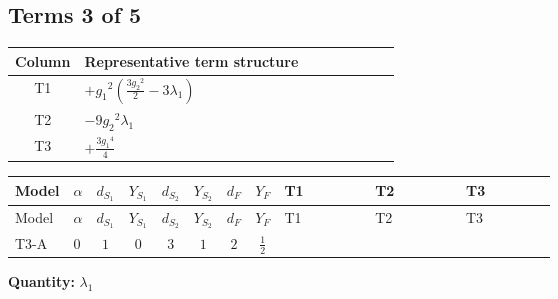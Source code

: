 \documentclass[8pt]{article}
\begin{document}
\begin{landscape}
\subsection*{Terms 3 of 5}
\begin{center}
\begin{tabular}{@{}c >{\raggedright\arraybackslash}p{0.82\linewidth}@{}}
\toprule
Column & Representative term structure \\
\midrule
T1 & \(\displaystyle +{g_1}^2 \left(\frac{3 {g_2}^2}{2}-3 {\lambda_1}\right)\) \\
\midrule
T2 & \(\displaystyle -9 {g_2}^2 {\lambda_1}\) \\
\midrule
T3 & \(\displaystyle +\frac{3 {g_1}^4}{4}\) \\
\midrule
\bottomrule
\end{tabular}
\end{center}
\smallskip
\tiny
\begin{longtable}{@{}llcccccc >{\raggedright\arraybackslash}p{0.21\linewidth} >{\raggedright\arraybackslash}p{0.21\linewidth} >{\raggedright\arraybackslash}p{0.21\linewidth}@{}}
\toprule
Model & $\alpha$ & $d_{S_1}$ & $Y_{S_1}$ & $d_{S_2}$ & $Y_{S_2}$ & $d_F$ & $Y_F$ & T1 & T2 & T3 \\
\midrule
\endfirsthead
\toprule
Model & $\alpha$ & $d_{S_1}$ & $Y_{S_1}$ & $d_{S_2}$ & $Y_{S_2}$ & $d_F$ & $Y_F$ & T1 & T2 & T3 \\
\midrule
\endhead
T3-A & $0$ & $1$ & $0$ & $3$ & $1$ & $2$ & $\frac{1}{2}$ & \scriptsize\adjustbox{max width=\linewidth}{$\begin{gathered} +{g_1}^2 \left(\frac{3 {g_2}^2}{2}-3 {\lambda_1}\right)\end{gathered}$} & \scriptsize\adjustbox{max width=\linewidth}{$\begin{gathered} -9 {g_2}^2 {\lambda_1}\end{gathered}$} & \scriptsize\adjustbox{max width=\linewidth}{$\begin{gathered} +\frac{3 {g_1}^4}{4}\end{gathered}$} \\
\midrule
\bottomrule
\end{longtable}
\clearpage
\noindent\textbf{Quantity: }$\lambda_1$\par\smallskip

\end{landscape}
\end{document}
